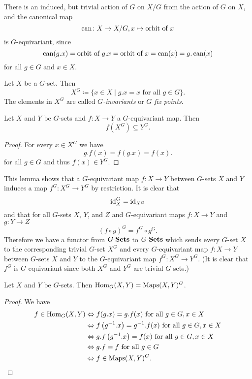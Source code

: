 \begin{note}
  There is an induced, but trivial action of $G$ on $X/G$ from the action of $G$ on $X$, and the canonical map
  \[
    \operatorname{can} \colon X \to X/G, x \mapsto \text{orbit of } x
  \]
  is $G$-equivariant, since
  \[
    \operatorname{can}(g.x) = \text{orbit of $g.x$} = \text{orbit of $x$} = \operatorname{can}(x) = g.\operatorname{can}(x)
  \]
  for all $g \in G$ and $x \in X$.
\end{note}


\begin{defi}
  Let $X$ be a $G$-set. Then
  \[
    X^G \coloneqq \{x \in X \mid g.x = x \text{ for all } g \in G\}.
  \]
  The elements in $X^G$ are called \emph{$G$-invariants} or \emph{$G$ fix points}.
\end{defi}


\begin{lem}
  Let $X$ and $Y$ be $G$-sets and $f \colon X \to Y$ a $G$-equivariant map. Then
  \[
    f\left( X^G \right) \subseteq Y^G.
  \]
\end{lem}
\begin{proof}
  For every $x \in X^G$ we have
  \[
    g.f(x) = f(g.x) = f(x).
  \]
  for all $g \in G$ and thus $f(x) \in Y^G$.
\end{proof}


This lemma shows that a $G$-equivariant map $f \colon X \to Y$ between $G$-sets $X$ and $Y$ induces a map $f^G \colon X^G \to Y^G$ by restriction. It is clear that
\[
  \operatorname{id}_X^G = \operatorname{id}_{X^G}
\]
and that for all $G$-sets $X$, $Y$, and $Z$ and $G$-equivariant maps $f \colon X \to Y$ and $g \colon Y \to Z$
\[
  (f \circ g)^G =  f^G \circ g^G.
\]
Therefore we have a functor from $G\text{-}\mathbf{Sets}$ to $G\text{-}\mathbf{Sets}$ which sends every $G$-set $X$ to the corresponding trivial $G$-set $X^G$ and every $G$-equivariant map $f \colon X \to Y$ between $G$-sets $X$ and $Y$ to the $G$-equivariant map $f^G \colon X^G \to Y^G$. (It is clear that $f^G$ is $G$-equivariant since both $X^G$ and $Y^G$ are trivial $G$-sets.)


\begin{lem}
  Let $X$ and $Y$ be $G$-sets. Then $\operatorname{Hom}_G(X,Y) = \operatorname{Maps}(X,Y)^G$.
\end{lem}
\begin{proof}
  We have
  \begin{align*}
    f \in \operatorname{Hom}_G(X,Y)
    &\Leftrightarrow f(g.x) = g.f(x) \text{ for all } g \in G, x \in X \\
    &\Leftrightarrow f\left(g^{-1}.x\right) = g^{-1}.f(x) \text{ for all } g \in G, x \in X \\
    &\Leftrightarrow g.f\left(g^{-1}.x\right) = f(x) \text{ for all } g \in G, x \in X \\
    &\Leftrightarrow g.f = f \text{ for all } g \in G \\
    &\Leftrightarrow f \in \operatorname{Maps}(X,Y)^G.
    \qedhere
  \end{align*}
\end{proof}


